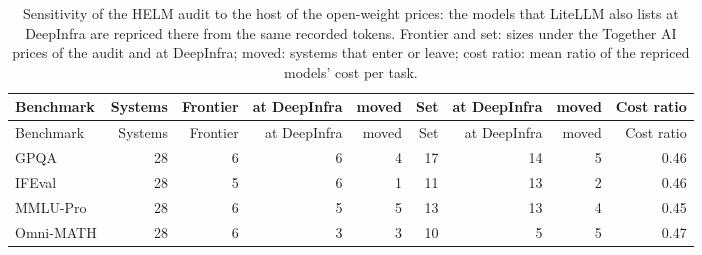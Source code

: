 \begin{longtable}{lrrrrrrrr}
\caption{Sensitivity of the HELM audit to the host of the open-weight prices: the models that LiteLLM also lists at DeepInfra are repriced there from the same recorded tokens. Frontier and set: sizes under the Together AI prices of the audit and at DeepInfra; moved: systems that enter or leave; cost ratio: mean ratio of the repriced models' cost per task.}\label{tab:supp-helm-pricesens}\\
\toprule
Benchmark & Systems & Frontier & at DeepInfra & moved & Set & at DeepInfra & moved & Cost ratio \\
\midrule
\endfirsthead
\toprule
Benchmark & Systems & Frontier & at DeepInfra & moved & Set & at DeepInfra & moved & Cost ratio \\
\midrule
\endhead
\bottomrule
\endfoot
GPQA & 28 & 6 & 6 & 4 & 17 & 14 & 5 & 0.46 \\
IFEval & 28 & 5 & 6 & 1 & 11 & 13 & 2 & 0.46 \\
MMLU-Pro & 28 & 6 & 5 & 5 & 13 & 13 & 4 & 0.45 \\
Omni-MATH & 28 & 6 & 3 & 3 & 10 & 5 & 5 & 0.47 \\
\end{longtable}
